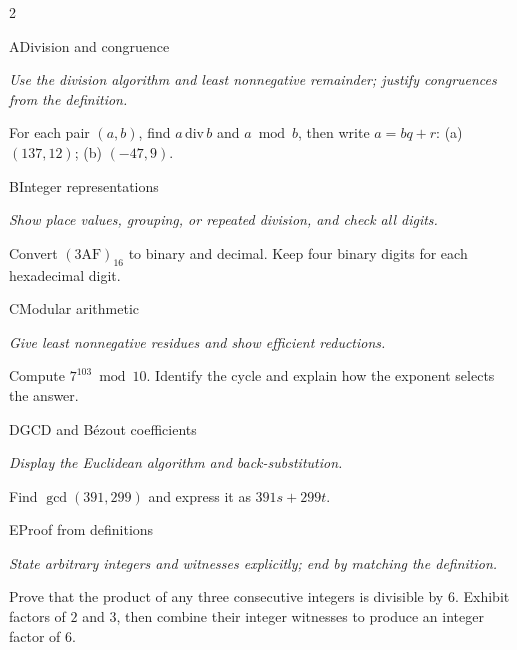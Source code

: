 \documentclass[9pt]{extarticle}
\begin{document}
\begin{multicols}{2}
\begin{CoreProblem}{A}{Division and congruence}
{\scriptsize\textit{Use the division algorithm and least nonnegative remainder; justify congruences from the definition.}\par}
For each pair $(a,b)$, find $a\,\mathrm{div}\,b$ and $a\bmod b$, then write
$a=bq+r$: (a) $(137,12)$; (b) $(-47,9)$.
\end{CoreProblem}
\begin{CoreProblem}{B}{Integer representations}
{\scriptsize\textit{Show place values, grouping, or repeated division, and check all digits.}\par}
Convert $(\mathrm{3AF})_{16}$ to binary and decimal. Keep four binary digits
for each hexadecimal digit.
\end{CoreProblem}
\begin{CoreProblem}{C}{Modular arithmetic}
{\scriptsize\textit{Give least nonnegative residues and show efficient reductions.}\par}
Compute $7^{103}\bmod10$. Identify the cycle and explain how the exponent
selects the answer.
\end{CoreProblem}
\columnbreak
\begin{CoreProblem}{D}{GCD and B\'ezout coefficients}
{\scriptsize\textit{Display the Euclidean algorithm and back-substitution.}\par}
Find $\gcd(391,299)$ and express it as $391s+299t$.
\end{CoreProblem}
\begin{CoreProblem}{E}{Proof from definitions}
{\scriptsize\textit{State arbitrary integers and witnesses explicitly; end by matching the definition.}\par}
Prove that the product of any three consecutive integers is divisible by $6$.
Exhibit factors of $2$ and $3$, then combine their integer witnesses to
produce an integer factor of $6$.
\end{CoreProblem}
\end{multicols}
\CoreWorkArea
\FormBreak
{}
\end{document}
